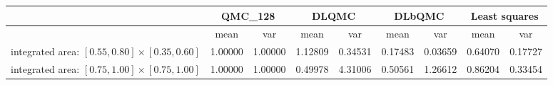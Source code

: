 \begin{tabular}{|l|c|c|c|c|c|c|c|c|}
\hline
 &\multicolumn{2}{c|}{\textbf{QMC\_128}}&\multicolumn{2}{c|}{\textbf{DLQMC}}&\multicolumn{2}{c|}{\textbf{DLbQMC}}&\multicolumn{2}{c|}{\textbf{Least squares}}\\ 
\hline

 &mean&var&mean&var&mean&var&mean&var\\ 
\hline
integrated area: $[0.55,0.80]\times [0.35,0.60]$ &1.00000&1.00000&1.12809&0.34531&0.17483&0.03659&0.64070&0.17727\\ 
\hline
integrated area: $[0.75,1.00]\times [0.75,1.00]$ &1.00000&1.00000&0.49978&4.31006&0.50561&1.26612&0.86204&0.33454\\ 
\hline
\end{tabular}

